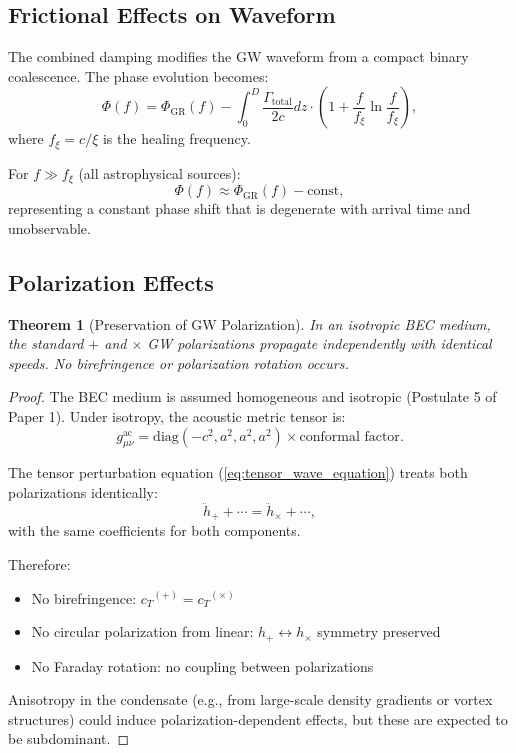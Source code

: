 \documentclass[11pt,a4paper]{article}
\newcommand{\cT}{\ensuremath{c_T}}
\newtheorem{theorem}{Theorem}[section]
\theoremstyle{definition}
\theoremstyle{remark}
\begin{document}
\subsection{Frictional Effects on Waveform}
\label{sec:friction_waveform}

The combined damping modifies the GW waveform from a compact binary coalescence. The phase evolution becomes:
\begin{equation}
\label{eq:modified_phase}
\Phi(f) = \Phi_{\mathrm{GR}}(f) - \int_0^D \frac{\Gamma_{\mathrm{total}}}{2c}dz \cdot \left(1 + \frac{f}{f_\xi}\ln\frac{f}{f_\xi}\right),
\end{equation}
where $f_\xi = c/\xi$ is the healing frequency.

For $f \gg f_\xi$ (all astrophysical sources):
\begin{equation}
\Phi(f) \approx \Phi_{\mathrm{GR}}(f) - \text{const},
\end{equation}
representing a constant phase shift that is degenerate with arrival time and unobservable.

\subsection{Polarization Effects}
\label{sec:polarization}

\begin{theorem}[Preservation of GW Polarization]
\label{thm:polarization}
In an isotropic BEC medium, the standard $+$ and $\times$ GW polarizations propagate independently with identical speeds. No birefringence or polarization rotation occurs.
\end{theorem}

\begin{proof}
The BEC medium is assumed homogeneous and isotropic (Postulate 5 of Paper 1). Under isotropy, the acoustic metric tensor is:
\begin{equation}
g_{\mu\nu}^{\mathrm{ac}} = \text{diag}(-c^2, a^2, a^2, a^2) \times \text{conformal factor}.
\end{equation}

The tensor perturbation equation (\ref{eq:tensor_wave_equation}) treats both polarizations identically:
\begin{equation}
\ddot{h}_+ + \cdots = \ddot{h}_\times + \cdots,
\end{equation}
with the same coefficients for both components.

Therefore:
\begin{itemize}
\item No birefringence: $\cT^{(+)} = \cT^{(\times)}$
\item No circular polarization from linear: $h_+ \leftrightarrow h_\times$ symmetry preserved
\item No Faraday rotation: no coupling between polarizations
\end{itemize}

Anisotropy in the condensate (e.g., from large-scale density gradients or vortex structures) could induce polarization-dependent effects, but these are expected to be subdominant. \qedhere
\end{proof}
\end{document}
